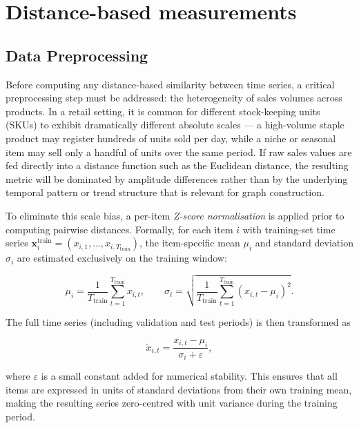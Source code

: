\section{Distance-based measurements}

\subsection{Data Preprocessing}

Before computing any distance-based similarity between time series, a critical preprocessing step must be addressed: the heterogeneity of sales volumes across products. In a retail setting, it is common for different stock-keeping units (SKUs) to exhibit dramatically different absolute scales — a high-volume staple product may register hundreds of units sold per day, while a niche or seasonal item may sell only a handful of units over the same period. If raw sales values are fed directly into a distance function such as the Euclidean distance, the resulting metric will be dominated by amplitude differences rather than by the underlying temporal pattern or trend structure that is relevant for graph construction.

To eliminate this scale bias, a per-item \textit{Z-score normalisation} is applied prior to computing pairwise distances. Formally, for each item $i$ with training-set time series $\mathbf{x}_i^{\text{train}} = (x_{i,1}, \ldots, x_{i,T_{\text{train}}})$, the item-specific mean $\mu_i$ and standard deviation $\sigma_i$ are estimated exclusively on the training window:

\begin{equation}
    \mu_i = \frac{1}{T_{\text{train}}} \sum_{t=1}^{T_{\text{train}}} x_{i,t}, \qquad
    \sigma_i = \sqrt{\frac{1}{T_{\text{train}}} \sum_{t=1}^{T_{\text{train}}} \left(x_{i,t} - \mu_i\right)^2}.
\end{equation}

The full time series (including validation and test periods) is then transformed as

\begin{equation}
    \tilde{x}_{i,t} = \frac{x_{i,t} - \mu_i}{\sigma_i + \varepsilon},
\end{equation}

where $\varepsilon$ is a small constant added for numerical stability. This ensures that all items are expressed in units of standard deviations from their own training mean, making the resulting series zero-centred with unit variance during the training period.

